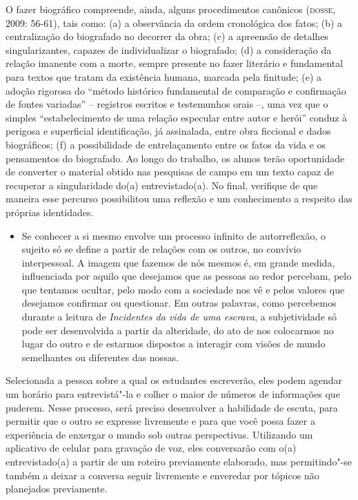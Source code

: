 \documentclass[12pt]{extarticle}
\begin{document}
O fazer biográfico compreende, ainda, alguns procedimentos canônicos
(\textsc{dosse}, 2009: 56-61), tais como: (a) a observância da ordem cronológica
dos fatos; (b) a centralização do biografado no decorrer da obra; (c) a
apreensão de detalhes singularizantes, capazes de individualizar o
biografado; (d) a consideração da relação imanente com a morte, sempre
presente no fazer literário e fundamental para textos que tratam da
existência humana, marcada pela finitude; (e) a adoção rigorosa do
``método histórico fundamental de comparação e confirmação de fontes
variadas'' -- registros escritos e testemunhos orais --, uma vez que o
simples ``estabelecimento de uma relação especular entre autor e herói''
conduz à perigosa e superficial identificação, já assinalada, entre obra
ficcional e dados biográficos; (f) a possibilidade de entrelaçamento
entre os fatos da vida e os pensamentos do biografado. Ao longo do
trabalho, os alunos terão oportunidade de converter o material obtido
nas pesquisas de campo em um texto capaz de recuperar a singularidade
do(a) entrevistado(a). No final, verifique de que maneira esse percurso
possibilitou uma reflexão e um conhecimento a respeito das próprias
identidades.

\begin{itemize}
\item
  Se conhecer a si mesmo envolve um processo infinito de autorreflexão,
  o sujeito só se define a partir de relações com os outros, no convívio
  interpessoal. A imagem que fazemos de nós mesmos é, em grande medida,
  influenciada por aquilo que desejamos que as pessoas ao redor
  percebam, pelo que tentamos ocultar, pelo modo com a sociedade nos vê
  e pelos valores que desejamos confirmar ou questionar. Em outras
  palavras, como percebemos durante a leitura de \emph{Incidentes da
  vida de uma escrava}, a subjetividade só pode ser desenvolvida a
  partir da alteridade, do ato de nos colocarmos no lugar do outro e de
  estarmos dispostos a interagir com visões de mundo semelhantes ou
  diferentes das nossas.
\end{itemize}

Selecionada a pessoa sobre a qual os estudantes escreverão, eles podem
agendar um horário para entrevistá"-la e colher o maior de números de
informações que puderem. Nesse processo, será preciso desenvolver a
habilidade de escuta, para permitir que o outro se expresse livremente e
para que você possa fazer a experiência de enxergar o mundo sob outras
perspectivas. Utilizando um aplicativo de celular para gravação de voz,
eles conversarão com o(a) entrevistado(a) a partir de um roteiro
previamente elaborado, mas permitindo"-se também a deixar a conversa
seguir livremente e enveredar por tópicos não planejados previamente.
\end{document}
